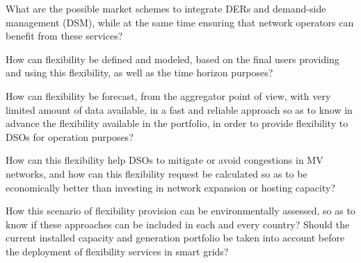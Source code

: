 
\begin{tcolorbox}
\begin{RQ}
\item What are the possible market schemes to integrate DERs and demand-side management (DSM), while at the same time ensuring that network operators can benefit from these services?  
\item How can flexibility be defined and modeled, based on the final users providing and using this flexibility, as well as the time horizon purposes? 
\item How can flexibility be forecast, from the aggregator point of view, with very limited amount of data available, in a fast and reliable approach so as to know in advance the flexibility available in the portfolio, in order to provide flexibility to DSOs for operation purposes?
\item How can this flexibility help DSOs to mitigate or avoid congestions in MV networks, and how can this flexibility request be calculated so as to be economically better than investing in network expansion or hosting capacity?
\item How this scenario of flexibility provision can be environmentally assessed, so as to know if these approaches can be included in each and every country? Should the current installed capacity and generation portfolio be taken into account before the deployment of flexibility services in smart grids?
\end{RQ}
\end{tcolorbox}
\vspace*{2mm}


